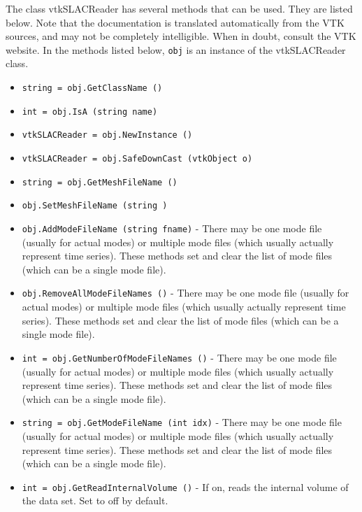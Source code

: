 The class vtkSLACReader has several methods that can be used.
  They are listed below.
Note that the documentation is translated automatically from the VTK sources,
and may not be completely intelligible.  When in doubt, consult the VTK website.
In the methods listed below, \verb|obj| is an instance of the vtkSLACReader class.
\begin{itemize}
\item  \verb|string = obj.GetClassName ()|

\item  \verb|int = obj.IsA (string name)|

\item  \verb|vtkSLACReader = obj.NewInstance ()|

\item  \verb|vtkSLACReader = obj.SafeDownCast (vtkObject o)|

\item  \verb|string = obj.GetMeshFileName ()|

\item  \verb|obj.SetMeshFileName (string )|

\item  \verb|obj.AddModeFileName (string fname)| -  There may be one mode file (usually for actual modes) or multiple mode
 files (which usually actually represent time series).  These methods
 set and clear the list of mode files (which can be a single mode file).

\item  \verb|obj.RemoveAllModeFileNames ()| -  There may be one mode file (usually for actual modes) or multiple mode
 files (which usually actually represent time series).  These methods
 set and clear the list of mode files (which can be a single mode file).

\item  \verb|int = obj.GetNumberOfModeFileNames ()| -  There may be one mode file (usually for actual modes) or multiple mode
 files (which usually actually represent time series).  These methods
 set and clear the list of mode files (which can be a single mode file).

\item  \verb|string = obj.GetModeFileName (int idx)| -  There may be one mode file (usually for actual modes) or multiple mode
 files (which usually actually represent time series).  These methods
 set and clear the list of mode files (which can be a single mode file).

\item  \verb|int = obj.GetReadInternalVolume ()| -  If on, reads the internal volume of the data set.  Set to off by default.


\end{itemize}
